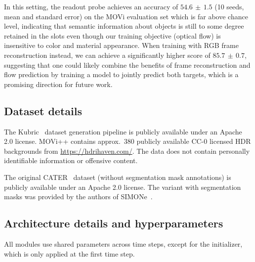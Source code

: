 \documentclass{article}
\begin{document}
In this setting, the readout probe achieves an accuracy of $54.6 \scriptstyle{\,\pm\,1.5}$ (10 seeds, mean and standard error) on the MOVi evaluation set which is far above chance level, indicating that semantic information about objects is still to some degree retained in the slots even though our training objective (optical flow) is insensitive to color and material appearance. When training with RGB frame reconstruction instead, we can achieve a significantly higher score of $85.7 \scriptstyle{\,\pm\,0.7}$, suggesting that one could likely combine the benefits of frame reconstruction and flow prediction by training a model to jointly predict both targets, which is a promising direction for future work.

\subsection{Dataset details}
\label{app:datasets}
The Kubric~\citep{kubric2021} dataset generation pipeline is publicly available under an Apache 2.0 license. MOVi++ contains approx.~380 publicly available CC-0 licensed HDR backgrounds from \url{https://hdrihaven.com/}. The data does not contain personally identifiable information or offensive content.

The original CATER~\citep{girdhar2019cater} dataset (without segmentation mask annotations) is publicly available under an Apache 2.0 license. The variant with segmentation masks was provided by the authors of SIMONe~\citep{kabra2021simone}.

\subsection{Architecture details and hyperparameters}
\label{app:architecture}
All modules use shared parameters across time steps, except for the initializer, which is only applied at the first time step.
\end{document}
